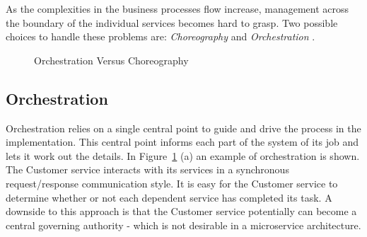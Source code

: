 \noindent As the complexities in the business processes flow increase, management across the boundary of the individual services becomes hard to grasp. Two possible choices to handle these problems are: \textit{Choreography} \cite[p. 45]{newman2015building} and \textit{Orchestration} \cite[p. 44]{newman2015building}.


\begin{figure}[H]%
    \centering
    \qquad
    \caption{Orchestration Versus Choreography}%
    \label{fig:orch_chor}%
\end{figure}

\subsection*{Orchestration}
Orchestration relies on a single central point to guide and drive the process in the implementation. This central point informs each part of the system of its job and lets it work out the details. In Figure~\ref{fig:orch_chor} (a) an example of orchestration is shown. The Customer service interacts with its services in a synchronous request/response communication style. It is easy for the Customer service to determine whether or not each dependent service has completed its task. A downside to this approach is that the Customer service potentially can become a central governing authority - which is not desirable in a microservice architecture.


